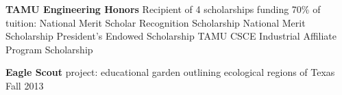 \documentclass[12pt]{article}
\begin{document}
\begin{flushleft}
\begin{outline}[compactitem]
    \1 \textbf{TAMU Engineering Honors}
    \1 Recipient of 4 scholarships funding 70\% of tuition:
    \2 National Merit Scholar Recognition Scholarship
    \2 National Merit Scholarship
    \2 President's Endowed Scholarship
    \2 TAMU CSCE Industrial Affiliate Program Scholarship


    \1 \textbf{Eagle Scout} project: educational garden outlining ecological regions of Texas \hfill Fall 2013

  \end{outline}
\end{flushleft}
\end{document}
